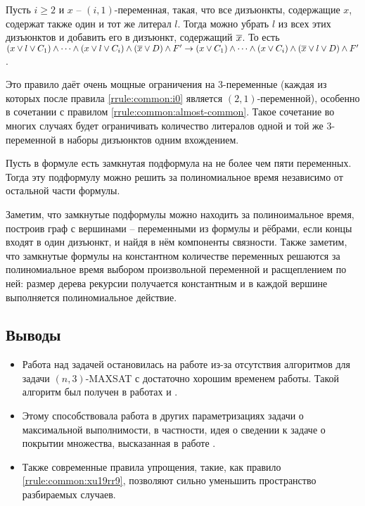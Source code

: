 \begin{rrule}
 Пусть $i \geq 2$ и $x$ -- $(i,1)$-переменная, такая, что все дизъюнкты, содержащие $x$, содержат также один и тот же литерал $l$. Тогда можно убрать $l$ из всех этих дизъюнктов и добавить его в дизъюнкт, содержащий $\overline{x}$. То есть $(x \vee l \vee C_1) \wedge \dots \wedge (x \vee l \vee C_i) \wedge (\overline{x} \vee D) \wedge F' \rightarrow (x \vee C_1) \wedge \dots \wedge (x \vee C_i) \wedge (\overline{x} \vee l \vee D) \wedge F'$.
 \label{rrule:common:xu19rr9}
\end{rrule}

Это правило даёт очень мощные ограничения на 3-переменные (каждая из которых после правила \ref{rrule:common:i0} является $(2,1)$-переменной), особенно в сочетании с правилом \ref{rrule:common:almost-common}. Такое сочетание во многих случаях будет ограничивать количество литералов одной и той же 3-переменной в наборы дизъюнктов одним вхождением.

\begin{rrule}
 Пусть в формуле есть замкнутая подформула на не более чем пяти переменных. Тогда эту подформулу можно решить за полиномиальное время независимо от остальной части формулы.
\end{rrule}

Заметим, что замкнутые подформулы можно находить за полиноимальное время, построив граф с вершинами -- переменными из формулы и рёбрами, если концы входят в один дизъюнкт, и найдя в нём компоненты связности. Также заметим, что замкнутые формулы на константном количестве переменных решаются за полиномиальное время выбором произвольной переменной и расщеплением по ней: размер дерева рекурсии получается константным и в каждой вершине выполняется полиномиальное действие.

\subsection{Выводы}
\label{subsec:literature-review:summary}

\begin{itemize}
 \item Работа над задачей остановилась на работе \cite{bansal99} из-за отсутствия алгоритмов для задачи $(n,3)$-MAXSAT с достаточно хорошим временем работы. Такой алгоритм был получен в работах \cite{li2017improved} и \cite{belova18}.
 \item Этому способствовала работа в других параметризациях задачи о максимальной выполнимости, в частности, идея о сведении к задаче о покрытии множества, высказанная в работе \cite{bliznets12}.
 \item Также современные правила упрощения, такие, как правило \ref{rrule:common:xu19rr9}, позволяют сильно уменьшить пространство разбираемых случаев.
\end{itemize}

